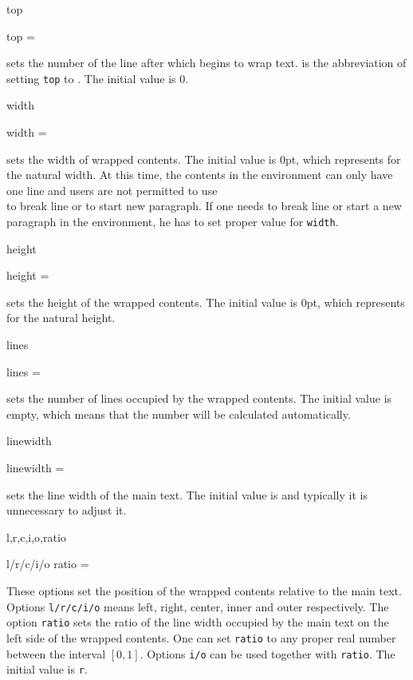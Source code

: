\documentclass{l3doc}
\newcommand{\opt}[1]{\texttt{#1}}
\begin{document}
\begin{function}{top}
  \begin{syntax}
    top = 
  \end{syntax}
  sets the number of the line after which  begins to wrap text.
   is the abbreviation of setting \texttt{top} to .
  The initial value is 0. 
\end{function}

\begin{function}{width}
  \begin{syntax}
    width = 
  \end{syntax}
  sets the width of wrapped contents. The initial value is 0pt,
  which represents for the natural width.
  At this time, the contents in the  environment
  can only have one line and users are not permitted to use
  \cmd\\ to break line or  to start new paragraph.
  If one needs to break line or start a new paragraph in the environment,
  he has to set proper value for \texttt{width}.
\end{function}

\begin{function}{height}
  \begin{syntax}
    height = 
  \end{syntax}
  sets the height of the wrapped contents. The initial value is 0pt,
  which represents for the natural height.
\end{function}

\begin{function}{lines}
  \begin{syntax}
    lines = 
  \end{syntax}
  sets the number of lines occupied by the wrapped contents.
  The initial value is empty, which means that the number will
  be calculated automatically.
\end{function}

\begin{function}{linewidth}
  \begin{syntax}
    linewidth = 
  \end{syntax}
  sets the line width of the main text.
  The initial value is  and typically it is unnecessary
  to adjust it.
\end{function}

\begin{function}{l,r,c,i,o,ratio}
  \begin{syntax}
    l/r/c/i/o
    ratio = 
  \end{syntax}
  These options set the position of the wrapped contents relative to
  the main text. Options \opt{l/r/c/i/o} means left, right, center,
  inner and outer respectively. The option \opt{ratio} sets the
  ratio of the line width occupied by the main text on the left side
  of the wrapped contents. One can set \opt{ratio} to any proper real number
  between the interval $[0,1]$.
  Options \opt{i/o} can be used together with \opt{ratio}.
  The initial value is \opt{r}.
\end{function}
\end{document}
